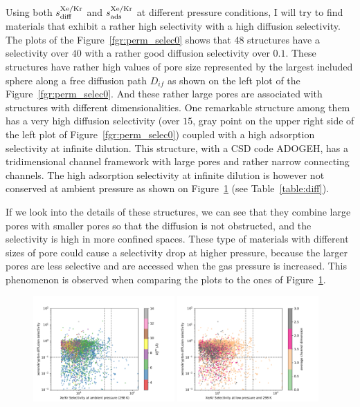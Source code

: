 \documentclass[main]{subfiles}
\begin{document}
Using both $s^{\text{Xe/Kr}}_{\text{diff}}$ and $s^{\text{Xe/Kr}}_{\text{ads}}$ at different pressure conditions, I will try to find materials that exhibit a rather high selectivity with a high diffusion selectivity. The plots of the Figure~\ref{fgr:perm_selec0} shows that 48 structures have a selectivity over $40$ with a rather good diffusion selectivity over $0.1$. These structures have rather high values of pore size represented by the largest included sphere along a free diffusion path $D_{if}$ as shown on the left plot of the Figure~\ref{fgr:perm_selec0}. And these rather large pores are associated with structures with different dimensionalities.
One remarkable structure among them has a very high diffusion selectivity (over $15$, gray point on the upper right side of the left plot of Figure~\ref{fgr:perm_selec0}) coupled with a high adsorption selectivity at infinite dilution. This structure, with a CSD code ADOGEH\cite{Peikert_2012}, has a tridimensional channel framework with large pores and rather narrow connecting channels. The high adsorption selectivity at infinite dilution is however not conserved at ambient pressure as shown on Figure~\ref{fgr:perm_selec2080}  (see Table~\ref{table:diff}).

If we look into the details of these structures, we can see that they combine large pores with smaller pores so that the diffusion is not obstructed, and the selectivity is high in more confined spaces. These type of materials with different sizes of pore could cause a selectivity drop at higher pressure, because the larger pores are less selective and are accessed when the gas pressure is increased. This phenomenon is observed when comparing the plots to the ones of Figure~\ref{fgr:perm_selec2080}.

\begin{figure}[ht]
  \centering
    \includegraphics[width=0.48\textwidth]{figures/5-diffusion/diff_D_xekr-s2080-lcd.pdf}
    \includegraphics[width=0.48\textwidth]{figures/5-diffusion/diff_D_xekr-s2080-chandim.pdf}
    \caption{}\label{fgr:perm_selec2080}
\end{figure}
\end{document}

